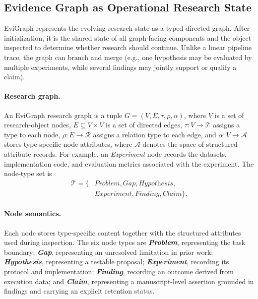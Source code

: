 \documentclass[letterpaper]{article} %
\newtheorem{definition}{Definition}
\begin{document}
\subsection{Evidence Graph as Operational Research State} \label{sec:evidence-graph} 

EviGraph represents the evolving research state as a typed directed graph. After initialization, it is the shared state of all graph-facing components and the object inspected to determine whether research should continue. Unlike a linear pipeline trace, the graph can branch and merge (e.g., one hypothesis may be evaluated by multiple experiments, while several findings may jointly support or qualify a claim).



\paragraph{Research graph.}
An EviGraph research graph is a tuple
$G=(V,E,\tau,\rho,\alpha)$, where $V$ is a set of research-object nodes,
$E\subseteq V\times V$ is a set of directed edges,
$\tau:V\rightarrow\mathcal{T}$ assigns a type to each node,
$\rho:E\rightarrow\mathcal{R}$ assigns a relation type to each edge, and
$\alpha:V\rightarrow\mathcal{A}$ stores type-specific node attributes, where
$\mathcal{A}$ denotes the space of structured attribute records. For example, an
\textit{Experiment} node records the datasets, implementation code, and evaluation
metrics associated with the experiment. The node-type set is
\[
\begin{aligned}
\mathcal{T}=\{&\textit{Problem},\textit{Gap},\textit{Hypothesis},\\
              &\textit{Experiment},\textit{Finding},\textit{Claim}\}.
\end{aligned}
\]

\paragraph{Node semantics.}
Each node stores type-specific content together with the structured attributes used during inspection. The six node types are \textbf{\textit{Problem}}, representing the task boundary; \textbf{\textit{Gap}}, representing an unresolved limitation in prior work; \textbf{\textit{Hypothesis}}, representing a testable proposal; \textbf{\textit{Experiment}}, recording its protocol and implementation; \textbf{\textit{Finding}}, recording an outcome derived from execution data; and \textbf{\textit{Claim}}, representing a manuscript-level assertion grounded in findings and carrying an explicit retention status.
\end{document}
